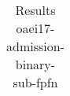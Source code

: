 \begin{table}[htb]
{\begin{tabular}[tb]{llllllllllllllllllllllllllllllllllllllll}
\end{tabular}

}

\caption{Results oaei17-admission-binary-sub-fpfn}

\label{tbl:results}

\end{table}